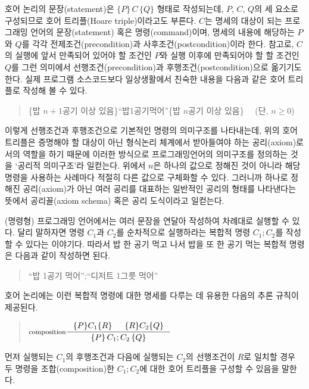 호어 논리의 문장(statement)은 $\{P\}\,C\,\{Q\}$ 형태로 작성되는데,
$P$, $C$, $Q$의 세 요소로 구성되므로 호어 트리플(Hoare triple)이라고도
부른다. $C$는 명세의 대상이 되는 프로그래밍 언어의 문장(statement) 혹은
명령(command)이며, 명세의 내용에 해당하는 ${P}$와 ${Q}$를 각각
전제조건(precondition)과 사후조건(postcondition)이라 한다.
참고로, $C$의 실행에 앞서 만족되어 있어야 할 조건인 $P$와
실행 이후에 만족되어야 할 할 조건인 $Q$를 그런 의미에서
선행조건(precondition)과 후행조건(postcondition)으로 옮기기도 한다.
실제 프로그램 소스코드보다 일상생활에서 친숙한 내용을 다음과 같은
호어 트리플로 작성해 볼 수 있다.
\begin{quote}\small
\{밥 $n+1$공기 이상 있음\}\;``밥\;1공기\;먹어''\;\{밥 $n$공기 이상 있음\}
~~(단, $n\ge 0$)
\end{quote}
이렇게 선행조건과 후행조건으로 기본적인 명령의 의미구조를 나타내는데,
위의 호어 트리플은 증명해야 할 대상이 아닌 형식논리 체계에서
받아들여야 하는 공리(axiom)로서의 역할을 하기 때문에 이러한 방식으로
프로그래밍언어의 의미구조를 정의하는 것을 `공리적 의미구조'라
일컫는다. 위에서 $n$은 하나의 값으로 정해진 것이 아니라 해당 명령을
사용하는 사례마다 적절히 다른 값으로 구체화할 수 있다. 그러니까 하나로
정해진 공리(axiom)가 아닌 여러 공리를 대표하는 일반적인 공리의 형태를
나타낸다는 뜻에서 공리꼴(axiom schema) 혹은 공리 도식이라고 일컫는다.

(명령형) 프로그래밍 언어에서는 여러 문장을 연달아 작성하여 차례대로
실행할 수 있다. 달리 말하자면 명령 $C_1$과 $C_2$를 순차적으로 실행하라는
복합적 명령 $C_1;C_2$를 작성할 수 있다는 이야기다. 따라서 밥 한 공기
먹고 나서 밥을 또 한 공기 먹는 복합적 명령은 다음과 같이 작성하면 된다.
\begin{quote}\small
``밥 1공기 먹어'';``디저트 1그릇 먹어''
\end{quote}
호어 논리에는 이런 복합적 명령에 대한 명세를 다루는 데 유용한
다음의 추론 규칙이 제공된다.
\begin{quote}
\( \inference[composition]{ \{P\}C_1\{R\} & \{R\}C_2\{Q\} }{
                            \{P\}\,C_1;C_2\,\{Q\} } \)
\end{quote}
먼저 실행되는 $C_1$의 후행조건과 다음에 실행되는 $C_2$의 선행조건이
$R$로 일치할 경우 두 명령을 조합(composition)한 $C_1;C_2$에 대한
호어 트리플을 구성할 수 있음을 말한다.

